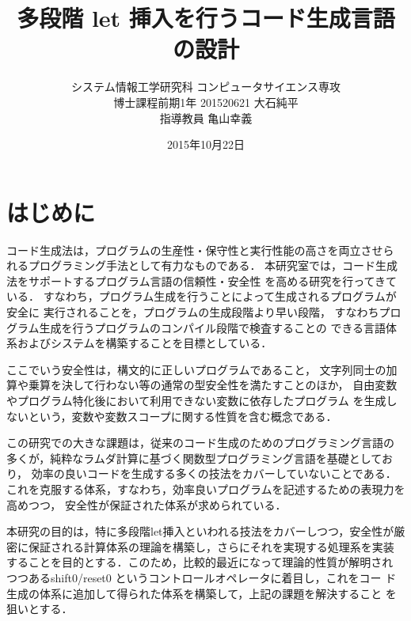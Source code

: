 \documentclass[10pt,a4j,xcolor=dvipsnames,twocolumn]{jarticle}
\title {\vspace{-2.0cm}多段階 let 挿入を行うコード生成言語の設計}
\date{2015年10月22日}
\author{システム情報工学研究科 コンピュータサイエンス専攻 \\
  博士課程前期1年 201520621 大石純平 \\
  指導教員 亀山幸義
}
\theoremstyle{definition}
\begin{document}
\maketitle

\section{はじめに}
コード生成法は，プログラムの生産性・保守性と実行性能の高さを両立させら
れるプログラミング手法として有力なものである．
本研究室では，コード生成法をサポートするプログラム言語の信頼性・安全性
を高める研究を行ってきている．
すなわち，プログラム生成を行うことによって生成されるプログラムが安全に
実行されることを，プログラムの生成段階より早い段階，
すなわちプログラム生成を行うプログラムのコンパイル段階で検査することの
できる言語体系およびシステムを構築することを目標としている．

ここでいう安全性は，構文的に正しいプログラムであること，
文字列同士の加算や乗算を決して行わない等の通常の型安全性を満たすことのほか，
自由変数やプログラム特化後において利用できない変数に依存したプログラム
を生成しないという，変数や変数スコープに関する性質を含む概念である．

この研究での大きな課題は，従来のコード生成のためのプログラミング言語の
多くが，純粋なラムダ計算に基づく関数型プログラミング言語を基礎としており，
効率の良いコードを生成する多くの技法をカバーしていないことである．
これを克服する体系，すなわち，効率良いプログラムを記述するための表現力を高めつつ，
安全性が保証された体系が求められている．

本研究の目的は，特に多段階let挿入といわれる技法をカバーしつつ，安全性が厳
密に保証される計算体系の理論を構築し，さらにそれを実現する処理系を実装
することを目的とする．このため，比較的最近になって理論的性質が解明され
つつあるshift0/reset0 というコントロールオペレータに着目し，これをコー
ド生成の体系に追加して得られた体系を構築して，上記の課題を解決すること
を狙いとする．


\end{document}
